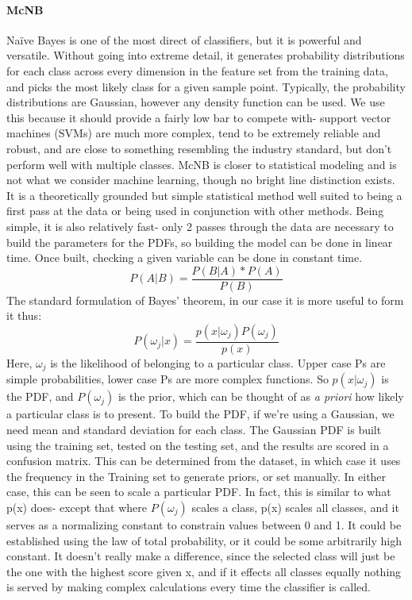\paragraph{McNB}
Na\"ive Bayes is one of the most direct of classifiers, but it is powerful and versatile.  Without going into extreme detail, it generates probability distributions for each class across every dimension in the feature set from the training data, and picks the most likely class for a given sample point.  Typically, the probability distributions are Gaussian, however any density function can be used.   We use this because it should provide a fairly low bar to compete with- support vector machines (SVMs) are much more complex, tend to be extremely reliable and robust, and are close to something resembling the industry standard, but don't perform well with multiple classes.  McNB is closer to statistical modeling and is not what we consider machine learning, though no bright line distinction exists.  It is a theoretically grounded but simple statistical method well suited to being a first pass at the data or being used in conjunction with other methods.  Being simple, it is also relatively fast- only 2 passes through the data are necessary to build the parameters for the PDFs, so building the model can be done in linear time.  Once built, checking a given variable can be done in constant time.
\begin{equation}
P(A|B) = \frac{P(B|A)*P(A)}{P(B)}
\end{equation}
The standard formulation of Bayes' theorem, in our case it is more useful to form it thus:
\begin{equation}
P(\omega_j|x) = \frac{p(x|\omega_j)P(\omega_j)}{p(x)}
\end{equation}
Here, $\omega_j$ is the likelihood of belonging to a particular class.  Upper case Ps are simple probabilities, lower case Ps are more complex functions. So $p(x|\omega_j)$ is the PDF, and $P(\omega_j)$ is the prior, which can be thought of as \textit{a priori} how likely a particular class is to present.  To build the PDF, if we're using a Gaussian, we need mean and standard deviation for each class.  The Gaussian PDF is built using the training set, tested on the testing set, and the results are scored in a confusion matrix.  This can be determined from the dataset, in which case it uses the frequency in the Training set to generate priors, or set manually.  In either case, this can be seen to scale a particular PDF.  In fact, this is similar to what p(x) does- except that where $P(\omega_j)$ scales a class, p(x) scales all classes, and it serves as a normalizing constant to constrain values between 0 and 1.  It could be established using the law of total probability, or it could be some arbitrarily high constant.  It doesn't really make a difference, since the selected class will just be the one with the highest score given x, and if it effects all classes equally nothing is served by making complex calculations every time the classifier is called.\\